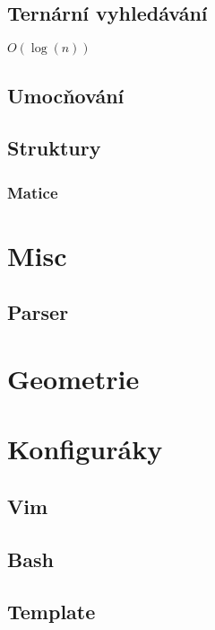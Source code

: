 \documentclass[10pt, a4paper]{article}
\begin{document}
\subsection{Ternární vyhledávání}
$O(\log(n))$


\subsection{Umocňování}


\subsection{Struktury}

\subsubsection{Matice}


\newpage

\section{Misc}

\subsection{Parser}


\newpage

\section{Geometrie}


\newpage

\section{Konfiguráky}
\subsection{Vim}

\subsection{Bash}

\subsection{Template}

\end{document}
